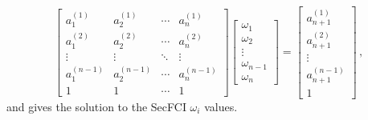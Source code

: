 \documentclass[letterpaper, 10 pt, conference]{ieeeconf}  %
\providecommand{\DIFaddbegin}{} %
\providecommand{\DIFaddend}{} %
\providecommand{\DIFdelbegin}{} %
\providecommand{\DIFdelend}{} %
\begin{document}
\begin{equation}
   \DIFdelbegin %
\DIFdelend \DIFaddbegin \begin{bmatrix}
      a_1^{(1)} & a_2^{(1)} & \cdots & a_{n}^{(1)} \\
      a_1^{(2)} & a_2^{(2)} & \cdots & a_{n}^{(2)} \\
      \vdots & \vdots & \ddots & \vdots \\
      a_1^{(n-1)} & a_2^{(n-1)} & \cdots & a_{n}^{(n-1)} \\
      1 & 1 & \cdots & 1
   \end{bmatrix}\DIFaddend 
   \DIFdelbegin %
\DIFdelend \DIFaddbegin \begin{bmatrix}
      \omega_1 \\
      \omega_2 \\
      \vdots \\
      \omega_{n-1} \\
      \omega_{n}
   \end{bmatrix}\DIFaddend 
   =
   \DIFdelbegin %
\DIFdelend \DIFaddbegin \begin{bmatrix}
      a_{n+1}^{(1)} \\
      a_{n+1}^{(2)} \\
      \vdots \\
      a_{n+1}^{(n-1)} \\
      1
   \end{bmatrix}\DIFaddend \,, \label{eqn:hyperplane_sol_eq}
\end{equation}
and gives the solution to the SecFCI $\omega_i$ values.
\end{document}
